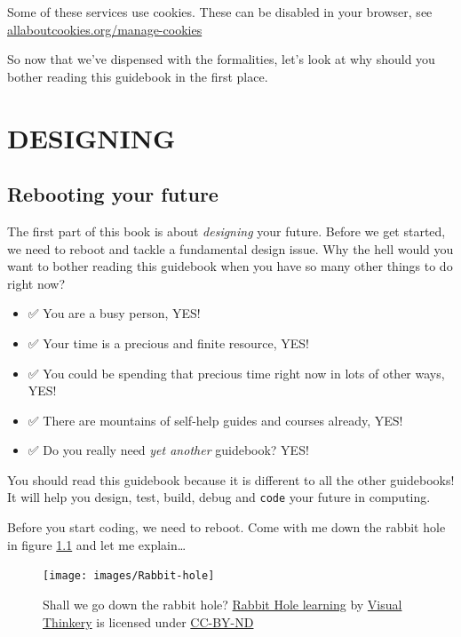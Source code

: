 \documentclass[
]{book}
\providecommand{\tightlist}{%
  \setlength{\itemsep}{0pt}\setlength{\parskip}{0pt}}
\begin{document}
Some of these services use cookies. These can be disabled in your browser, see \href{https://www.allaboutcookies.org/manage-cookies/}{allaboutcookies.org/manage-cookies}

So now that we've dispensed with the formalities, let's look at why should you bother reading this guidebook in the first place.













\hypertarget{part-designing}{%
\part{DESIGNING}\label{part-designing}}

\hypertarget{rebooting}{%
\chapter{Rebooting your future}\label{rebooting}}

The first part of this book is about \emph{designing} your future. Before we get started, we need to reboot and tackle a fundamental design issue. Why the hell would you want to bother reading this guidebook when you have so many other things to do right now?

\begin{itemize}
\tightlist
\item
  ✅ You are a busy person, YES!
\item
  ✅ Your time is a precious and finite resource, YES!
\item
  ✅ You could be spending that precious time right now in lots of other ways, YES!
\item
  ✅ There are mountains of self-help guides and courses already, YES!
\item
  ✅ Do you really need \emph{yet another} guidebook? YES!
\end{itemize}

You should read this guidebook because it is different to all the other guidebooks! It will help you design, test, build, debug and \texttt{code} your future in computing.

Before you start coding, we need to reboot. Come with me down the rabbit hole in figure \ref{fig:rabbit-fig} and let me explain\ldots{} 🐇

\begin{figure}

{\centering \texttt{[image: images/Rabbit-hole]} 

}

\caption{Shall we go down the rabbit hole? \href{https://bryanmmathers.com/rabbit-hole-learning/}{Rabbit Hole learning} by \href{https://visualthinkery.com}{Visual Thinkery} is licensed under \href{https://creativecommons.org/licenses/by-nd/4.0/}{CC-BY-ND}}\label{fig:rabbit-fig}
\end{figure}
\end{document}
